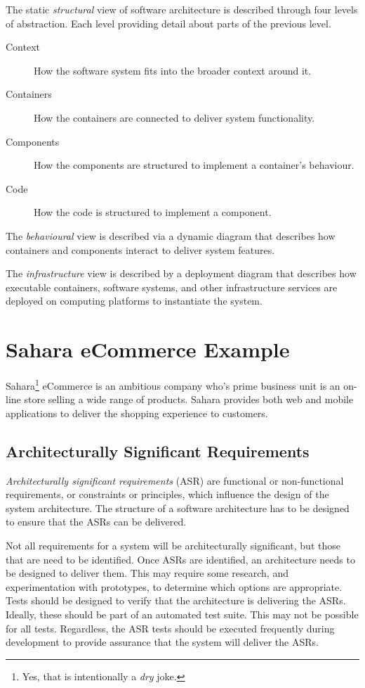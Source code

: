 The static \emph{structural} view of software architecture is described through four levels of abstraction.
Each level providing detail about parts of the previous level.
\begin{description}
    \item[Context] How the software system fits into the broader context around it.
    \item[Containers] How the containers are connected to deliver system functionality.
    \item[Components] How the components are structured to implement a container's behaviour.
    \item[Code] How the code is structured to implement a component.
\end{description}

The \emph{behavioural} view is described via a dynamic diagram that describes how
containers and components interact to deliver system features.

The \emph{infrastructure} view is described by a deployment diagram that describes how
executable containers, software systems, and other infrastructure services are
deployed on computing platforms to instantiate the system.


\section{Sahara eCommerce Example}\label{sec:storeExample}
Sahara\footnote{Yes, that is intentionally a \textit{dry} joke.} eCommerce is an ambitious company who's prime business unit is an on-line store selling a wide range of products.
Sahara provides both web and mobile applications to deliver the shopping experience to customers.

\subsection{Architecturally Significant Requirements}\label{sec:storeReq}
\emph{Architecturally significant requirements} (ASR) are functional or non-functional requirements,
or constraints or principles, which influence the design of the system architecture.
The structure of a software architecture has to be designed to ensure that the ASRs can be delivered.

\noindent
Not all requirements for a system will be architecturally significant, but those that are need to be identified.
Once ASRs are identified, an architecture needs to be designed to deliver them.
This may require some research, and experimentation with prototypes, to determine which options are appropriate.
Tests should be designed to verify that the architecture is delivering the ASRs.
Ideally, these should be part of an automated test suite.
This may not be possible for all tests.
Regardless, the ASR tests should be executed frequently during development to provide assurance that the system will deliver the ASRs.

